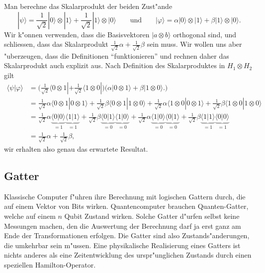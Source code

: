 \begin{beispiel}
Man berechne das Skalarprodukt der beiden Zust"ande
\[
|\psi\rangle
=
\frac1{\sqrt{2}} |0\rangle\otimes|1\rangle
+
\frac1{\sqrt{2}} |1\rangle\otimes|0\rangle
\qquad
\text{und}
\qquad
|\varphi\rangle
=
\alpha |0\rangle\otimes|1\rangle
+
\beta |1\rangle\otimes|0\rangle.
\]
Wir k"onnen verwenden, dass die Basisvektoren $|a\otimes b\rangle$ orthogonal
sind, und schliessen, dass das Skalarprodukt
$\frac1{\sqrt{2}}\alpha + \frac1{\sqrt{2}}\beta$ sein muss.
Wir wollen uns aber "uberzeugen, dass die Definitionen ``funktionieren''
und rechnen daher das Skalarprodukt auch explizit aus.
Nach Definition des Skalarproduktes in $H_1\otimes H_2$ gilt
\begin{align*}
\langle\psi|\varphi\rangle
&=
\biggl(
\frac1{\sqrt{2}} \langle 0 \otimes 1|
+
\frac1{\sqrt{2}} \langle 1\otimes0|
\biggr)
\biggl(
\alpha |0\otimes 1\rangle
+
\beta |1\otimes 0\rangle.
\biggr)
\\
&=
\frac1{\sqrt{2}} \alpha\langle 0\otimes 1|0\otimes 1\rangle
+
\frac1{\sqrt{2}} \beta \langle 0\otimes 1|1\otimes 0\rangle
+
\frac1{\sqrt{2}} \alpha\langle 1\otimes 0|0\otimes 1\rangle
+
\frac1{\sqrt{2}} \beta \langle 1\otimes 0|1\otimes 0\rangle
\\
&=
\frac1{\sqrt{2}} \alpha\underbrace{\langle 0|0\rangle}_{=1} \underbrace{\langle 1|1\rangle}_{=1}
+
\frac1{\sqrt{2}} \beta \underbrace{\langle 0|1\rangle}_{=0} \underbrace{\langle 1|0\rangle}_{=0}
+
\frac1{\sqrt{2}} \alpha\underbrace{\langle 1|0\rangle}_{=0} \underbrace{\langle 0|1\rangle}_{=0}
+
\frac1{\sqrt{2}} \beta \underbrace{\langle 1|1\rangle}_{=1} \underbrace{\langle 0|0\rangle}_{=1}
\\
&=
\frac1{\sqrt{2}}\alpha + \frac1{\sqrt{2}}\beta,
\end{align*}
wir erhalten also genau das erwartete Resultat.
\end{beispiel}

\subsection{Gatter}
Klassische Computer f"uhren ihre Berechnung mit logischen Gattern durch,
die auf einem Vektor von Bits wirken.
Quantencomputer brauchen Quanten-Gatter, welche auf einem
$n$ Qubit Zustand wirken.
Solche Gatter d"urfen selbst keine Messungen machen, den die
Auswertung der Berechnung darf ja erst ganz am Ende der
Transformationen erfolgen.
Die Gatter sind also Zustands"anderungen, die umkehrbar sein m"ussen.
Eine physikalische Realisierung eines Gatters ist nichts anderes
als eine Zeitentwicklung des urspr"unglichen Zustands durch einen
speziellen Hamilton-Operator.

